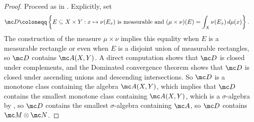 \documentclass[../notes.tex]{subfiles}
\begin{document}
\begin{proof}
	Proceed as in . Explicitly, set
	\[\mc D\coloneqq\left\{E\subseteq X\times Y:x\mapsto\nu(E_x)\text{ is measurable and }(\mu\times\nu)(E)=\int_X\nu(E_x)\,d\mu(x)\right\}.\]
	The construction of the measure $\mu\times\nu$ implies this equality when $E$ is a measurable rectangle or even when $E$ is a disjoint union of measurable rectangles, so $\mc D$ contains $\mc A(X,Y)$. A direct computation shows that $\mc D$ is closed under complements, and the Dominated convergence theorem \cite[Theorem~9.14]{elber-top} shows that $\mc D$ is closed under ascending unions and descending intersections. So $\mc D$ is a monotone class containing the algebra $\mc A(X,Y)$, which implies that $\mc D$ contains the smallest monotone class containing $\mc A(X,Y)$, which is a $\sigma$-algebra by , so $\mc D$ contains the smallest $\sigma$-algebra containing $\mc A$, so $\mc D$ contains $\mc M\otimes\mc N$.
\end{proof}
\end{document}
